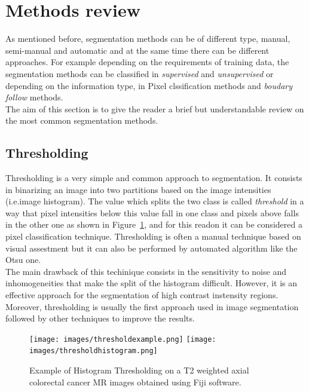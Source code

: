 \documentclass[12pt,a4paper]{report}
\begin{document}
\section{Methods review}

As mentioned before, segmentation methods can be of different type, manual, semi-manual and automatic and at the same time there can be different approaches. For example depending on the requirements of training data, the segmentation methods can be classified in \textit{supervised} and \textit{unsupervised} or depending on the information type, in Pixel clssification methods and \textit{boudary follow} methods\cite{Biondi}.\\
The aim of this section is to give the reader a brief but understandable review on the most common segmentation methods.

\subsection{Thresholding}

Thresholding is a very simple and common approach to segmentation. It consists in binarizing an image into two partitions based on the image intensities (i.e.image histogram)\cite{segmentationreview}. The value which splits the two class is called \textit{threshold} in a way that pixel intensities below this value fall in one class and pixels above falls in the other one as shown in Figure~\ref{threshold}, and for this readon it can be considered a pixel classification technique. Thresholding is often a manual technique based on visual assestment but it can also be performed by automated algorithm like the Otsu one.\\
The main drawback of this techinique consists in the sensitivity to noise and inhomogeneities that make the split of the histogram difficult. However, it is an effective approach for the segmentation of high contrast instensity regions. Moreover, thresholding is usually the first approach used in image segmentation followed by other techniques to improve the results\cite{Biondi}.

\begin{figure}[htp]

    \centering
    \texttt{[image: images/thresholdexample.png]}\hspace{0.5cm}
    \texttt{[image: images/thresholdhistogram.png]}
    
    
    \caption{Example of Histogram Thresholding on a T2 weighted axial colorectal cancer MR images obtained using Fiji software\cite{Fiji}.}
    \label{threshold}
    
    \end{figure}
\end{document}
